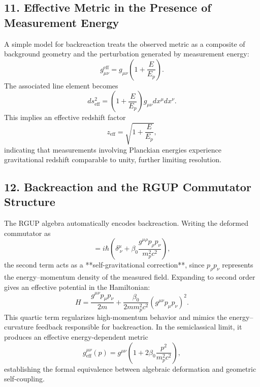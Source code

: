 \documentclass[11pt,oneside]{book}
\numberwithin{equation}{chapter}
\newcommand{\betaz}{\beta_0}
\begin{document}
\subsection*{11. Effective Metric in the Presence of Measurement Energy}

A simple model for backreaction treats the observed metric as a composite of background geometry and the perturbation generated by measurement energy:
\begin{equation}
g_{\mu\nu}^{\text{eff}} = g_{\mu\nu}
\left(1 + \frac{E}{E_p}\right).
\end{equation}
The associated line element becomes
\begin{equation}
ds^2_{\text{eff}} = 
\left(1+\frac{E}{E_p}\right)
g_{\mu\nu}dx^\mu dx^\nu.
\end{equation}
This implies an effective redshift factor
\begin{equation}
z_{\text{eff}} = \sqrt{1+\frac{E}{E_p}},
\end{equation}
indicating that measurements involving Planckian energies experience gravitational redshift comparable to unity, further limiting resolution.

\subsection*{12. Backreaction and the RGUP Commutator Structure}

The RGUP algebra automatically encodes backreaction.  
Writing the deformed commutator as
\begin{equation}
[x^\mu,p_\nu] = i\hbar
\left(\delta^\mu_{\ \nu}
+ \betaz\frac{g^{\mu\rho}p_\rho p_\nu}{m_p^2 c^2}\right),
\end{equation}
the second term acts as a **self-gravitational correction**, since $p_\rho p_\nu$ represents the energy–momentum density of the measured field.  
Expanding to second order gives an effective potential in the Hamiltonian:
\begin{equation}
H = \frac{g^{\mu\nu}p_\mu p_\nu}{2m}
+ \frac{\betaz}{2m m_p^2 c^2}
(g^{\mu\nu}p_\mu p_\nu)^2.
\end{equation}
This quartic term regularizes high-momentum behavior and mimics the energy–curvature feedback responsible for backreaction.  
In the semiclassical limit, it produces an effective energy-dependent metric
\begin{equation}
g^{\mu\nu}_{\text{eff}}(p)
= g^{\mu\nu}
\left(1 + 2\betaz\frac{p^2}{m_p^2 c^2}\right),
\end{equation}
establishing the formal equivalence between algebraic deformation and geometric self-coupling.
\end{document}

